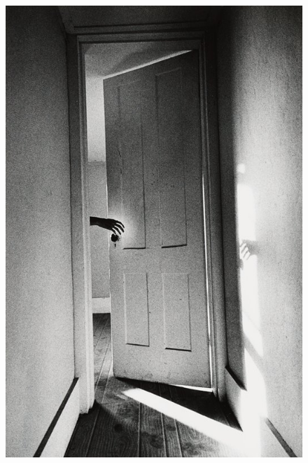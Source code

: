 \begin{figure}[htpb!]
\thispagestyle{empty}
\vspace*{-2cm}
\hspace*{-2.3cm}
\includegraphics[width=1.5\textwidth]{./IMAGEM.jpg}
\end{figure}



